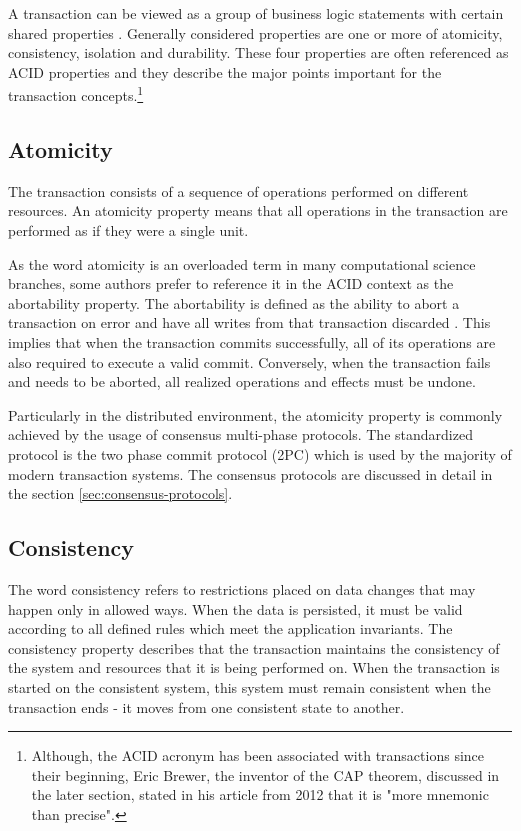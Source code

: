 \documentclass[oneside,
  digital, %
  table,   %
  nolof,     %
  nolot,     %
]{fithesis3}
\begin{document}
A transaction can be viewed as a group of business logic statements with certain shared properties \cite{nar_wf}. Generally considered properties are one or more of atomicity, consistency, isolation and durability. These four properties are often referenced as ACID properties \cite{haerder_reuter_1983} and they describe the major points important for the transaction concepts.\footnote{Although, the ACID acronym has been associated with transactions since their beginning, Eric Brewer, the inventor of the CAP theorem, discussed in the later section, stated in his article from 2012 that it is "more mnemonic than precise".\cite{cap_12years}}

\subsection{Atomicity}

The transaction consists of a sequence of operations performed on different resources. An atomicity property means that all operations in the transaction are performed as if they were a single unit. 

As the word atomicity is an overloaded term in many computational science branches, some authors prefer to reference it in the ACID context as the abortability property. The abortability is defined as  the ability to abort a transaction on error and have all writes from that transaction discarded \cite{design_data_intens_apps}. This implies that when the transaction commits successfully, all of its operations are also required to execute a valid commit. Conversely, when the transaction fails and needs to be aborted, all realized operations and effects must be undone.

Particularly in the distributed environment, the atomicity property is commonly achieved by the usage of consensus multi-phase protocols. The standardized protocol is the two phase commit protocol (2PC) which is used by the majority of modern transaction systems. The consensus protocols are discussed in detail in the section \ref{sec:consensus-protocols}.

\subsection{Consistency}

The word consistency refers to restrictions placed on data changes that may happen only in allowed ways. When the data is persisted, it must be valid according to all defined rules which meet the application invariants. The consistency property describes that the transaction maintains the consistency of the system and resources that it is being performed on. When the transaction is started on the consistent system, this system must remain consistent when the transaction ends - it moves from one consistent state to another.
\end{document}

